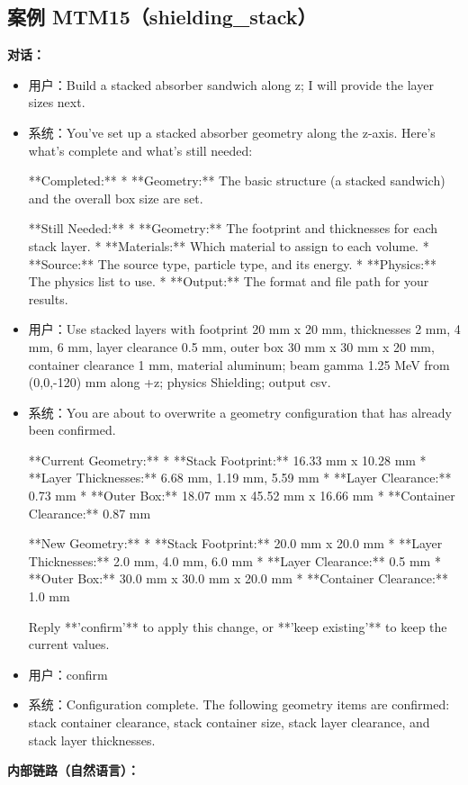 \documentclass[11pt]{ctexart}
\begin{document}
\subsection{案例 MTM15（shielding\_stack）}
\textbf{对话：}
\begin{itemize}
\item 用户：Build a stacked absorber sandwich along z; I will provide the layer sizes next.
\item 系统：You've set up a stacked absorber geometry along the z-axis. Here's what's complete and what's still needed:

**Completed:**
*   **Geometry:** The basic structure (a stacked sandwich) and the overall box size are set.

**Still Needed:**
*   **Geometry:** The footprint and thicknesses for each stack layer.
*   **Materials:** Which material to assign to each volume.
*   **Source:** The source type, particle type, and its energy.
*   **Physics:** The physics list to use.
*   **Output:** The format and file path for your results.
\item 用户：Use stacked layers with footprint 20 mm x 20 mm, thicknesses 2 mm, 4 mm, 6 mm, layer clearance 0.5 mm, outer box 30 mm x 30 mm x 20 mm, container clearance 1 mm, material aluminum; beam gamma 1.25 MeV from (0,0,-120) mm along +z; physics Shielding; output csv.
\item 系统：You are about to overwrite a geometry configuration that has already been confirmed.

**Current Geometry:**
*   **Stack Footprint:** 16.33 mm x 10.28 mm
*   **Layer Thicknesses:** 6.68 mm, 1.19 mm, 5.59 mm
*   **Layer Clearance:** 0.73 mm
*   **Outer Box:** 18.07 mm x 45.52 mm x 16.66 mm
*   **Container Clearance:** 0.87 mm

**New Geometry:**
*   **Stack Footprint:** 20.0 mm x 20.0 mm
*   **Layer Thicknesses:** 2.0 mm, 4.0 mm, 6.0 mm
*   **Layer Clearance:** 0.5 mm
*   **Outer Box:** 30.0 mm x 30.0 mm x 20.0 mm
*   **Container Clearance:** 1.0 mm

Reply **'confirm'** to apply this change, or **'keep existing'** to keep the current values.
\item 用户：confirm
\item 系统：Configuration complete. The following geometry items are confirmed: stack container clearance, stack container size, stack layer clearance, and stack layer thicknesses.
\end{itemize}
\textbf{内部链路（自然语言）：}
\end{document}
